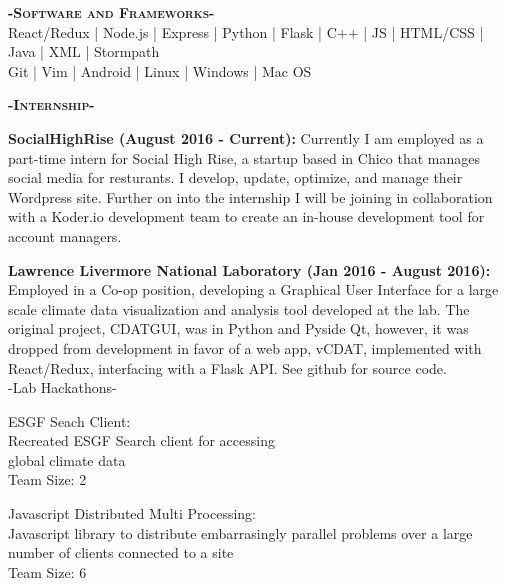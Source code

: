 \documentclass[12pt]{article}
\begin{document}
\center
\color{black}
\textbf{\textsc{-Software and Frameworks-}}\\
\medskip
\color{Cerulean}React/Redux | Node.js  | Express | Python | Flask  | C++ | JS | HTML/CSS | Java | XML | Stormpath\color{gray}\\
\smallskip
Git | Vim | Android | Linux | Windows | Mac OS\\
\color{black}
\begin{center}
\textbf{\textsc{-Internship-}}\\
\end{center}
\begin{footnotesize}

\flushleft
\color{Cerulean}\textbf{SocialHighRise (August 2016 - Current):}
\color{black}Currently I am employed as a part-time intern for Social High Rise, a startup based in Chico that manages social media for resturants. I develop, update, optimize, and manage their Wordpress site. Further on into the internship I will be joining in collaboration with a \color{TealBlue}Koder.io \color{black} development team to create an in-house development tool for account managers.
\medskip

\color{Cerulean}\textbf{Lawrence Livermore National Laboratory (Jan 2016 - August 2016):} 
\color{Black}Employed in a Co-op position, developing a Graphical User Interface for a large scale climate data visualization and analysis tool developed at the lab. The original project, CDATGUI, was in \color{TealBlue}Python and Pyside Qt, \color{Black} however, it was dropped from development in favor of a web app, vCDAT, implemented with \color{TealBlue}React/Redux\color{Black}, interfacing with a \color{TealBlue}Flask \color{Black}API. See github for source code.\\

\center
-Lab Hackathons-
\begin{multicols}{2}
\center
\color{Cerulean}ESGF Seach Client:\\ \color{black}
Recreated ESGF Search client for accessing\\
global climate data\\
Team Size: 2

\columnbreak

\color{Cerulean}Javascript Distributed Multi Processing:\\ \color{black}
Javascript library to distribute embarrasingly parallel problems over a large number of clients connected to a site\\
Team Size: 6


\end{multicols}
\medskip

\end{footnotesize}
\end{document}

